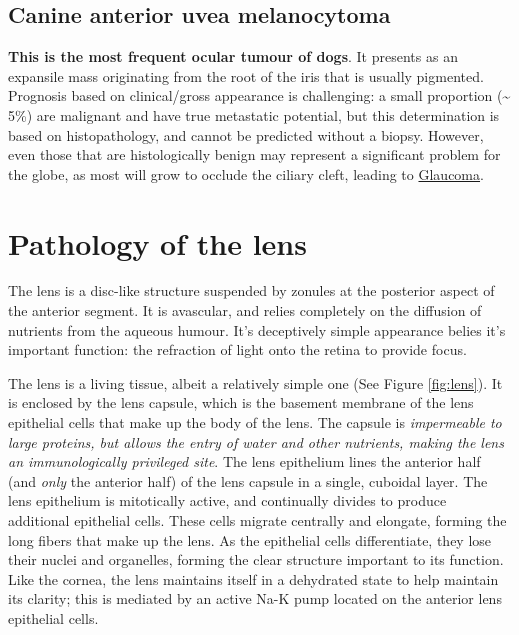 \documentclass[openany]{article}
\begin{document}
\hypertarget{canine-anterior-uvea-melanocytoma}{\subsection{Canine
anterior uvea melanocytoma}\label{canine-anterior-uvea-melanocytoma}}

\textbf{This is the most frequent ocular tumour of dogs}. It presents as
an expansile mass originating from the root of the iris that is usually
pigmented. Prognosis based on clinical/gross appearance is challenging:
a small proportion (\textasciitilde{} 5\%) are malignant and have true
metastatic potential, but this determination is based on histopathology,
and cannot be predicted without a biopsy. However, even those that are
histologically benign may represent a significant problem for the globe,
as most will grow to occlude the ciliary cleft, leading to
\protect\hyperlink{glaucoma}{Glaucoma}.

\hypertarget{pathology-of-the-lens}{\section{Pathology of the
lens}\label{pathology-of-the-lens}}

The lens is a disc-like structure suspended by zonules at the posterior
aspect of the anterior segment. It is avascular, and relies completely
on the diffusion of nutrients from the aqueous humour. It's deceptively
simple appearance belies it's important function: the refraction of
light onto the retina to provide focus.

The lens is a living tissue, albeit a relatively simple one (See Figure
\ref{fig:lens}). It is enclosed by the lens capsule, which is the
basement membrane of the lens epithelial cells that make up the body of
the lens. The capsule is \emph{impermeable to large proteins, but allows
the entry of water and other nutrients, making the lens an
immunologically privileged site}. The lens epithelium lines the anterior
half (and \emph{only} the anterior half) of the lens capsule in a
single, cuboidal layer. The lens epithelium is mitotically active, and
continually divides to produce additional epithelial cells. These cells
migrate centrally and elongate, forming the long fibers that make up the
lens. As the epithelial cells differentiate, they lose their nuclei and
organelles, forming the clear structure important to its function. Like
the cornea, the lens maintains itself in a dehydrated state to help
maintain its clarity; this is mediated by an active Na-K pump located on
the anterior lens epithelial cells.
\end{document}
